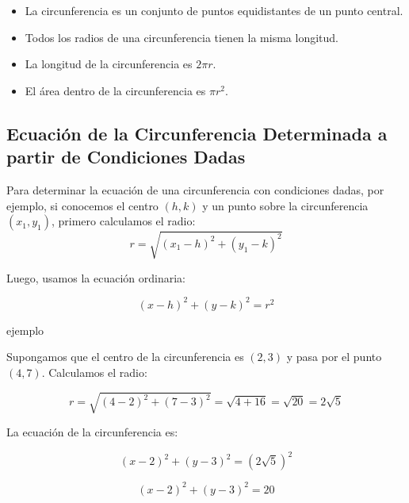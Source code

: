 \begin{itemize}
    \item La circunferencia es un conjunto de puntos equidistantes de un punto central.
    \item Todos los radios de una circunferencia tienen la misma longitud.
    \item La longitud de la circunferencia es \(2 \pi r\).
    \item El área dentro de la circunferencia es \(\pi r^2\).
\end{itemize}

\subsection{Ecuación de la Circunferencia Determinada a partir de Condiciones Dadas}

Para determinar la ecuación de una circunferencia con condiciones dadas, por ejemplo, si conocemos el centro \((h, k)\) y un punto sobre la circunferencia \((x_1, y_1)\), primero calculamos el radio:
\begin{equation}
    r = \sqrt{(x_1 - h)^2 + (y_1 - k)^2}
\end{equation}

Luego, usamos la ecuación ordinaria:

\[
(x - h)^2 + (y - k)^2 = r^2
\]

ejemplo

Supongamos que el centro de la circunferencia es \((2, 3)\) y pasa por el punto \((4, 7)\). Calculamos el radio:

\[
r = \sqrt{(4 - 2)^2 + (7 - 3)^2} = \sqrt{4 + 16} = \sqrt{20} = 2\sqrt{5}
\]

La ecuación de la circunferencia es:

\[
(x - 2)^2 + (y - 3)^2 = (2\sqrt{5})^2
\]

\[
(x - 2)^2 + (y - 3)^2 = 20
\]

        
